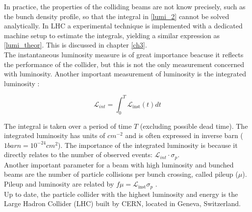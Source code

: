 In practice, the properties of the colliding beams are not know precisely, such as the bunch density profile, so that the integral in  \ref{lumi_2} cannot be solved analytically. In LHC a experimental technique is implemented with a dedicated machine setup to estimate the integrals, yielding a similar expression as \ref{lumi_theor}. This is discussed in chapter \ref{ch3}.\\
The instantaneous luminosity measure is of great importance beacuse it reflects the performance of the collider, but  this is not the only measurement concerned with luminosity. Another important measurement of luminosity is the integrated luminosity \cite{ref_lib_vol3}:

\begin{equation}
  \mathcal{L}_{int}=\int_{0}^{T} \mathcal {L}_{\text{inst}}(t) dt
\end{equation}

The integral is taken over a period of time $T$ (excluding possible dead time). The integrated luminosity has units of $cm^{-2}$ and is often expressed in inverse barn ($1 barn= 10^{-24}cm^{2}$). The importance of the integrated luminosity  is because it directly relates to the number of observed events: $ \mathcal{L}_{int}\cdot \sigma_{p}$. \\Another important parameter for a beam with high luminosity and bunched beams are the number of particle collisions per bunch crossing, called pileup ($\mu$). Pileup and luminosity are related by  $f \mu= \mathcal{L}_{\text{inst}} \sigma_{p}$ .\\
Up to date, the particle collider with the highest luminosity and energy is the Large Hadron Collider (LHC) built by CERN, located in 	Geneva, Switzerland.


